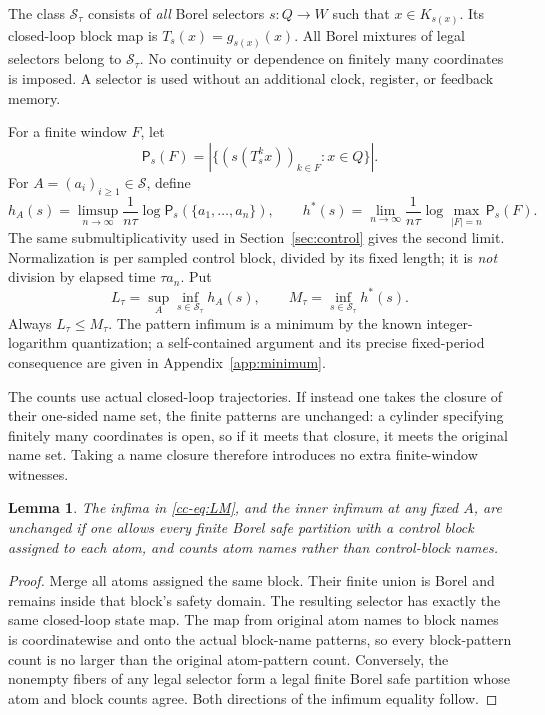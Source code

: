 \documentclass[11pt,reqno]{amsart}
\numberwithin{equation}{section}
\newtheorem{lemma}[theorem]{Lemma}
\theoremstyle{definition}
\newcommand{\Patt}{\mathsf P}
\newcommand{\hpat}{h^{*}}
\newcommand{\Ssafe}{\mathcal S}
\begin{document}
The class $\Ssafe_\tau$ consists of \emph{all} Borel selectors $s:Q\to W$
such that $x\in K_{s(x)}$. Its closed-loop block map is
$T_s(x)=g_{s(x)}(x)$. All Borel mixtures of legal selectors belong to
$\Ssafe_\tau$. No continuity or dependence on finitely many coordinates
is imposed. A selector is used without an additional clock, register,
or feedback memory.

For a finite window $F$, let
\[
 \Patt_s(F)=\left|\{(s(T_s^k x))_{k\in F}:x\in Q\}\right|.
\]
For $A=(a_i)_{i\ge1}\in\mathscr S$, define
\[
 h_A(s)=\limsup_{n\to\infty}\frac{1}{n\tau}
       \log\Patt_s(\{a_1,\ldots,a_n\}),\qquad
 h^*(s)=\lim_{n\to\infty}\frac{1}{n\tau}
       \log\max_{|F|=n}\Patt_s(F).
\]
The same submultiplicativity used in Section~\ref{sec:control} gives
the second limit. Normalization is per sampled control block, divided
by its fixed length; it is \emph{not} division by elapsed time $\tau a_n$.
Put
\begin{equation}\label{cc-eq:LM}
 L_\tau=\sup_A\inf_{s\in\Ssafe_\tau}h_A(s),\qquad
 M_\tau=\inf_{s\in\Ssafe_\tau}\hpat(s).
\end{equation}
Always $L_\tau\le M_\tau$. The pattern infimum is a minimum by the known integer-logarithm quantization; a self-contained argument and its precise fixed-period consequence are given in Appendix~\ref{app:minimum}.

The counts use actual closed-loop trajectories. If instead one takes
the closure of their one-sided name set, the finite patterns are
unchanged: a cylinder specifying finitely many coordinates is open, so
if it meets that closure, it meets the original name set. Taking a name
closure therefore introduces no extra finite-window witnesses.

\begin{lemma}\label{cc-lem:merge}
The infima in \eqref{cc-eq:LM}, and the inner infimum at any fixed $A$, are
unchanged if one allows every finite Borel safe partition with a
control block assigned to each atom, and counts atom names rather than
control-block names.
\end{lemma}
\begin{proof}
Merge all atoms assigned the same block. Their finite union is Borel
and remains inside that block's safety domain. The resulting selector
has exactly the same closed-loop state map. The map from original atom
names to block names is coordinatewise and onto the actual block-name
patterns, so every block-pattern count is no larger than the original
atom-pattern count. Conversely, the nonempty fibers of any legal
selector form a legal finite Borel safe partition whose atom and
block counts agree. Both directions of the infimum equality follow.
\end{proof}
\end{document}
